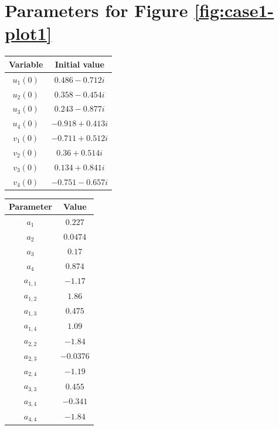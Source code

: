 \documentclass[11pt,a4paper]{article}
\begin{document}

\section{Parameters for Figure \ref{fig:case1-plot1}}
\label{app:case1-params}

\noindent
\begin{minipage}[t]{0.48\textwidth}
\centering
{}
\label{tab:case1-init}
\begin{tabular}{c c}
\hline
Variable & Initial value \\
\hline
$u_1(0)$ & $0.486-0.712i$ \\
$u_2(0)$ & $0.358-0.454i$ \\
$u_3(0)$ & $0.243-0.877i$ \\
$u_4(0)$ & $-0.918+0.413i$ \\
$v_1(0)$ & $-0.711+0.512i$ \\
$v_2(0)$ & $0.36+0.514i$ \\
$v_3(0)$ & $0.134+0.841i$ \\
$v_4(0)$ & $-0.751-0.657i$ \\
\hline
\end{tabular}
\end{minipage}
\hfill
\begin{minipage}[t]{0.48\textwidth}
\centering
{}
\label{tab:case1-params}
\begin{tabular}{c c}
\hline
Parameter & Value \\
\hline
$a_1$ & $0.227$ \\
$a_2$ & $0.0474$ \\
$a_3$ & $0.17$ \\
$a_4$ & $0.874$ \\
$a_{1,1}$ & $-1.17$ \\
$a_{1,2}$ & $1.86$ \\
$a_{1,3}$ & $0.475$ \\
$a_{1,4}$ & $1.09$ \\
$a_{2,2}$ & $-1.84$ \\
$a_{2,3}$ & $-0.0376$ \\
$a_{2,4}$ & $-1.19$ \\
$a_{3,3}$ & $0.455$ \\
$a_{3,4}$ & $-0.341$ \\
$a_{4,4}$ & $-1.84$ \\
\hline
\end{tabular}
\end{minipage}
\end{document}
